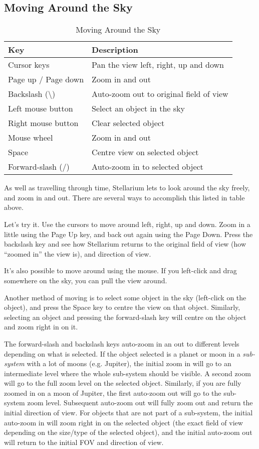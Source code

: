 \subsection{Moving Around the Sky}

\begin{table}[h]
\centering
\begin{tabular}{l l}
\toprule
\textbf{Key} & \textbf{Description}\\
\midrule
Cursor keys & Pan the view left, right, up and down \\
Page up / Page down & Zoom in and out \\
Backslash (\textbackslash{}) & Auto-zoom out to original field of
view \\
Left mouse button & Select an object in the sky \\
Right mouse button & Clear selected object \\
Mouse wheel & Zoom in and out \\ 
Space & Centre view on selected object \\
Forward-slash (/) & Auto-zoom in to selected object \\
\bottomrule
\end{tabular}
\caption{Moving Around the Sky}
\end{table}

As well as travelling through time, Stellarium lets to look around the
sky freely, and zoom in and out. There are several ways to accomplish
this listed in table above.

Let's try it. Use the cursors to move around left, right, up and down.
Zoom in a little using the Page Up key, and back out again using the
Page Down. Press the backslash key and see how Stellarium returns to the
original field of view (how ``zoomed in'' the view is), and direction of
view.

It's also possible to move around using the mouse. If you left-click and
drag somewhere on the sky, you can pull the view around.

Another method of moving is to select some object in the sky (left-click
on the object), and press the Space key to centre the view on that
object. Similarly, selecting an object and pressing the forward-slash
key will centre on the object and zoom right in on it.

The forward-slash and backslash keys auto-zoom in an out to different
levels depending on what is selected. If the object selected is a planet
or moon in a \emph{sub-system} with a lot of moons (e.g. Jupiter), the
initial zoom in will go to an intermediate level where the whole
sub-system should be visible. A second zoom will go to the full zoom
level on the selected object. Similarly, if you are fully zoomed in on a
moon of Jupiter, the first auto-zoom out will go to the sub-system zoom
level. Subsequent auto-zoom out will fully zoom out and return the
initial direction of view. For objects that are not part of a
sub-system, the initial auto-zoom in will zoom right in on the selected
object (the exact field of view depending on the size/type of the
selected object), and the initial auto-zoom out will return to the
initial FOV and direction of view.

